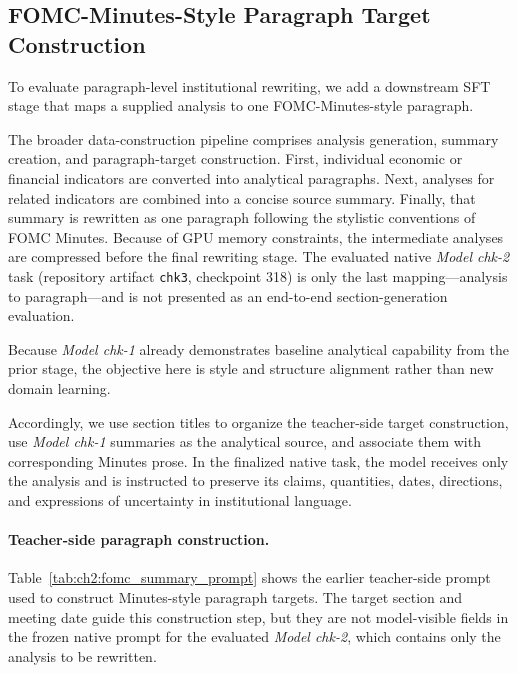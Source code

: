 \subsection*{FOMC-Minutes-Style Paragraph Target Construction}


To evaluate paragraph-level institutional rewriting, we add a downstream SFT
stage that maps a supplied analysis to one FOMC-Minutes-style paragraph.


The broader data-construction pipeline comprises analysis generation, summary
creation, and paragraph-target construction. First, individual economic or
financial indicators are converted into analytical paragraphs. Next, analyses
for related indicators are combined into a concise source summary. Finally,
that summary is rewritten as one paragraph following the stylistic conventions
of FOMC Minutes. Because of GPU memory constraints, the intermediate analyses
are compressed before the final rewriting stage. The evaluated native
\textit{Model chk-2} task (repository artifact \texttt{chk3}, checkpoint 318)
is only the last mapping---analysis to paragraph---and is not presented as an
end-to-end section-generation evaluation.


Because \textit{Model chk-1} already demonstrates baseline analytical capability from the prior stage, the objective here is style and structure alignment rather than new domain learning.


Accordingly, we use section titles to organize the teacher-side target
construction, use \textit{Model chk-1} summaries as the analytical source, and
associate them with corresponding Minutes prose. In the finalized native task,
the model receives only the analysis and is instructed to preserve its claims,
quantities, dates, directions, and expressions of uncertainty in institutional
language.



\paragraph*{Teacher-side paragraph construction.}

Table~\ref{tab:ch2:fomc_summary_prompt} shows the earlier teacher-side prompt
used to construct Minutes-style paragraph targets. The target section and
meeting date guide this construction step, but they are not model-visible
fields in the frozen native prompt for the evaluated \textit{Model chk-2},
which contains only the analysis to be rewritten.


